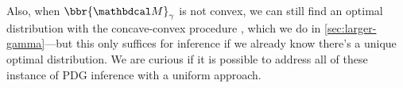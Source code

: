 Also, when $\bbr{\dg M}_\gamma$ is not convex, we can still find an optimal distribution with the concave-convex procedure \cite{yuille2003concave}, which we do in \cref{sec:larger-gamma}---but this only suffices for inference if we already know there's a unique optimal distribution.
We are curious if it is possible to address all of these instance of PDG inference with a uniform approach.
